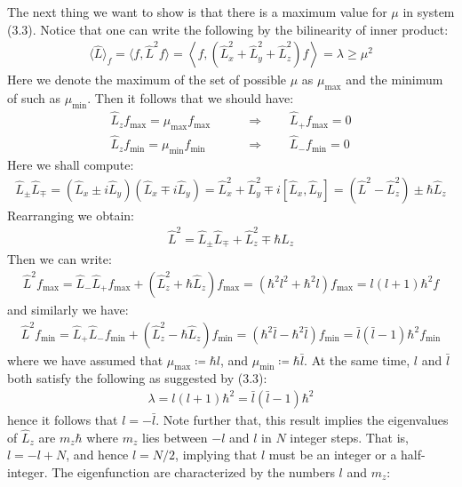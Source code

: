 \documentclass[11pt]{book}
\theoremstyle{break}
\theoremstyle{break}
\begin{document}
The next thing we want to show is that there is a maximum value for $\mu$ in system (3.3). Notice that one can write the following by the bilinearity of inner product:
\begin{align*}
\langle \hat{L}\rangle_{f} = \langle f, \hat{L}^2 f\rangle = \left\langle f, \left(\hat{L}_x^2 + \hat{L}_y^2 + \hat{L}_z^2\right) f\right\rangle = \lambda  \geq \mu^2 
\end{align*}
Here we denote the maximum of the set of possible $\mu$ as $\mu_{\max}$ and the minimum of such as $\mu_{\min}$. Then it follows that we should have:
\begin{align*}
\hat{L}_z f_{\max} = \mu_{\max} f_{\max} \qquad &\Rightarrow \qquad \hat{L}_+ f_{\max} = 0\\
\hat{L}_z f_{\min} = \mu_{\min} f_{\min} \qquad &\Rightarrow \qquad \hat{L}_- f_{\min} = 0
\end{align*}
Here we shall compute:
\begin{align*}
\hat{L}_{\pm}\hat{L}_{\mp} = \left( \hat{L}_x \pm i \hat{L}_y\right)\left( \hat{L}_{x}\mp i\hat{L}_y\right) = \hat{L}_x^2 + \hat{L}_y^2 \mp i \left[ \hat{L}_x, \hat{L}_y \right] = \left( \hat{L}^2 - \hat{L}_z^2 \right) \pm \hbar \hat{L}_z
\end{align*}
Rearranging we obtain:
\begin{align*}
\hat{L}^2 = \hat{L}_{\pm}\hat{L}_{\mp} + \hat{L}_z^2 \mp \hbar \hat{L}_z
\end{align*}
Then we can write:
\begin{align*}
\hat{L}^2 f_{\max} = \hat{L}_- \hat{L}_+ f_{\max} + \left( \hat{L}_z^2 + \hbar \hat{L}_z\right) f_{\max} = (\hbar^2 l^2 +\hbar^2 l)f_{\max} = l(l+1)\hbar^2 f
\end{align*}
and similarly we have:
\begin{align*}
\hat{L}^2 f_{\min} = \hat{L}_+\hat{L}_-f_{\min} +\left( \hat{L}_z^2 - \hbar \hat{L}_z \right) f_{\min} =(\hbar^2\bar{l} - \hbar^2 \bar{l}) f_{\min}=  \bar{l}(\bar{l} - 1)\hbar^2 f_{\min}
\end{align*}
where we have assumed that $\mu_{\max} \coloneqq \hbar l$, and $\mu_{\min} \coloneqq \hbar \bar{l}$. At the same time, $l$ and $\bar{l}$ both satisfy the following as suggested by (3.3):
\begin{align*}
\lambda = l(l+1) \hbar^2 = \bar{l}(\bar{l}-1)\hbar^2
\end{align*}
hence it follows that $l = -\bar{l}$. Note further that, this result implies the eigenvalues of $\hat{L}_z$ are $m_z \hbar$ where $m_z$ lies between $-l$ and $l$ in $N$ integer steps. That is, $l = -l+N$, and hence $l = N/2$, implying that $l$ must be an integer or a half-integer. The eigenfunction are characterized by the numbers $l$ and $m_z$:
\end{document}
